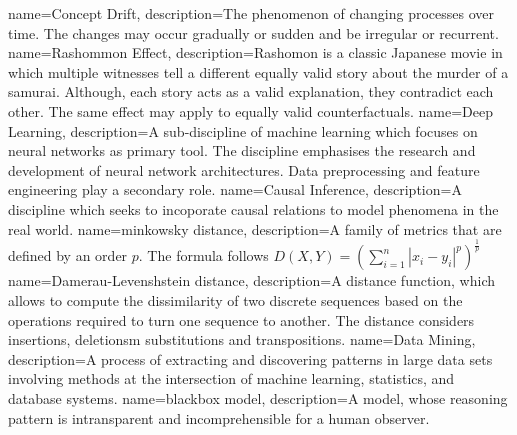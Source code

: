 {
        name=Concept Drift,
        description={The phenomenon of changing processes over time. The changes may occur gradually or sudden and be irregular or recurrent.}
}
{
        name=Rashommon Effect,
        description={Rashomon is a classic Japanese movie in which multiple witnesses tell a different equally valid story about the murder of a samurai. Although, each story acts as a valid explanation, they contradict each other. The same effect may apply to equally valid counterfactuals.}
}
{
        name=Deep Learning,
        description={A sub-discipline of machine learning which focuses on neural networks as primary tool. The discipline emphasises the research and development of neural network architectures. Data preprocessing and feature engineering play a secondary role.}
}
{
        name=Causal Inference,
        description={A discipline which seeks to incoporate causal relations to model phenomena in the real world.}
}
{
        name=minkowsky distance,
        description={A family of metrics that are defined by an order $p$. The formula follows $D(X, Y)=\left(\sum_{i=1}^{n}\left|x_{i}-y_{i}\right|^{p}\right)^{\frac{1}{p}}$}
}
{
        name=Damerau-Levenshstein distance,
        description={A distance function, which allows to compute the dissimilarity of two discrete sequences based on the operations required to turn one sequence to another. The distance considers insertions, deletionsm substitutions and transpositions.}
}
{
        name=Data Mining,
        description={A process of extracting and discovering patterns in large data sets involving methods at the intersection of machine learning, statistics, and database systems.}
}
{
        name=blackbox model,
        description={A model, whose reasoning pattern is intransparent and incomprehensible for a human observer.}
}
